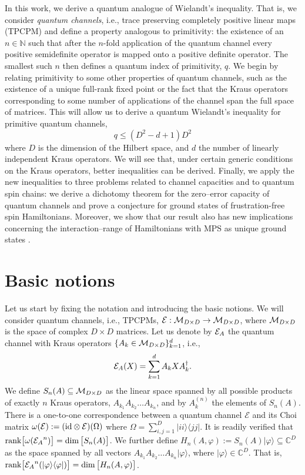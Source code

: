 \documentclass[journal,twoside]{IEEEtran}
\newcommand{\1}{\mathbbm{1}}
\def\id{{\rm id}}
\def\E{{\cal E}}
\renewcommand{\>}{\rangle}
\newcommand{\<}{\langle}
\def\C{\mathbb{C}}
\def\E{\mathcal{E}}
\def\MDD{{\cal M}_{D\times D}}
\begin{document}
In this work, we derive a quantum analogue of Wielandt's inequality.
That is, we consider \emph{quantum channels}, i.e., trace preserving
completely positive linear maps (TPCPM) and define a property
analogous to primitivity: the existence of an $n\in\mathbb{N}$ such
that after the $n$-fold application of the quantum channel every
positive semidefinite operator is mapped onto a  positive definite
operator. The smallest such $n$ then defines a quantum index of
primitivity, $q$. We begin by relating primitivity to some other
properties of quantum channels, such as the existence of a unique
full-rank fixed point or the fact that the Kraus operators
corresponding to some number of applications of the channel span the
full space of matrices. This will allow us to derive a quantum
Wielandt's inequality for primitive quantum channels,
\begin{equation*} q\le
(D^2 - d + 1)D^2
\end{equation*}
where $D$ is the dimension of the Hilbert space, and $d$ the
number of linearly independent Kraus operators. We will see that,
under certain generic conditions on the Kraus operators, better
inequalities can be derived. Finally, we apply the new inequalities
to three problems related to channel capacities and to quantum spin
chains:  we derive a dichotomy theorem for the zero--error capacity
of quantum channels and prove a conjecture for ground states of
frustration-free spin Hamiltonians. Moreover, we show that our
result also has new implications concerning the interaction--range
of Hamiltonians with MPS as unique ground states \cite{PVWC07}.


\section{Basic notions}
Let us start by fixing the notation and
introducing the basic notions. We will consider quantum channels,
i.e., TPCPMs,  ${\cal E}:\MDD \to \MDD$, where $\MDD$ is the space
of complex $D \times D$ matrices. Let us denote by ${\cal E}_A$ the
quantum channel with Kraus operators $\{A_k\in\MDD\}_{k=1}^d$, i.e.,
\begin{equation}
 {\cal E}_A(X)=\sum_{k=1}^d A_k X A_k^\dagger.
\end{equation}
We define $S_n(A)\subseteq \MDD$ as the linear space spanned by all
possible products of exactly $n$ Kraus operators, $A_{k_1} A_{k_2}
\ldots A_{k_n}$, and by $A^{(n)}_k$ the elements of $S_n(A)$. There
is a one-to-one correspondence between a quantum channel $\E$ and
its Choi matrix $\omega(\E):=(\id\otimes\E)(\Omega)$ where
$\Omega=\sum_{i,j=1}^D|ii\>\<jj|$. It is readily verified that ${\rm
rank}\big[\omega({\E_A}^n)\big]=\dim\big[S_n(A)\big]$. We further
define $H_n(A,\varphi):= S_n(A)|\varphi\rangle \subseteq \C^D$ as
the space spanned by all vectors $A_{k_1} A_{k_2} \ldots
A_{k_n}|\varphi\rangle$, where $|\varphi\rangle\in\C^D$. That is,
${\rm
rank}\big[{\E_A}^n(|\varphi\>\<\varphi|)\big]=\dim\big[H_n(A,\varphi)\big]$.
\end{document}

